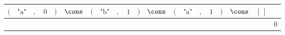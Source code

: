 {\scriptsize\setlength{\tabcolsep}{1.5pt}%
\begin{tabular}{ccccccccccccccccccc|l}
$($ & $\text{"a"}$ & $,$ & $\text{0}$ & $)$ & $\cons$ & $($ & $\text{"b"}$ & $,$ & $\text{1}$ & $)$ & $\cons$ & $($ & $\text{"a"}$ & $,$ & $\text{1}$ & $)$ & $\cons$ & $[\,]$ & \\ \hline
\gcell{$$} & \gcell{$$} & \gcell{$$} & \gcell{$$} & \gcell{$$} & \gcell{$\posC{\circ}$} & \gcell{$$} & \gcell{$$} & \gcell{$$} & \gcell{$$} & \gcell{$$} & \gcell{$$} & \gcell{$$} & \gcell{$$} & \gcell{$$} & \gcell{$$} & \gcell{$$} & \gcell{$$} & \gcell{$$} & $\text{0}$ \\
\end{tabular}}
